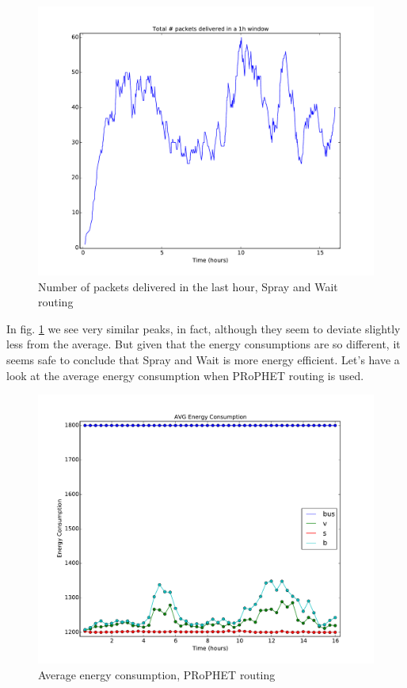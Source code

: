\documentclass[conference]{IEEEtran}
\begin{document}
\begin{figure}
  \includegraphics[scale=0.25, center]{../one_1.5.1-RC2/plots/SprayAndWait_NUM_DELIVERED_PKTS_IN_WND.pdf}
  \caption{Number of packets delivered in the last hour, Spray and Wait routing}
  \label{fig:pkts_in_wnd:snw}
\end{figure}

In fig. \ref{fig:pkts_in_wnd:snw} we see very similar peaks, in fact, although they seem to deviate slightly less from the average. But given that the energy consumptions are so different, it seems safe to conclude that Spray and Wait is more energy efficient. Let's have a look at the average energy consumption when PRoPHET routing is used.

\begin{figure}
  \includegraphics[scale=0.25, center]{../one_1.5.1-RC2/plots/ProphetRouter_AVG_ENERGY_CONSUMPTION.pdf}
  \caption{Average energy consumption, PRoPHET routing}
  \label{fig:avg_consumpt:prophet}
\end{figure}
\end{document}
